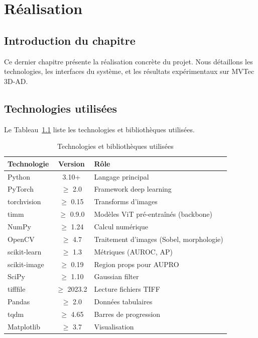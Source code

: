 \documentclass[12pt,a4paper,oneside]{report}
\begin{document}
\chapter{Réalisation}

\section*{Introduction du chapitre}

Ce dernier chapitre présente la réalisation concrète du projet. Nous détaillons les technologies, les interfaces du système, et les résultats expérimentaux sur MVTec 3D-AD.

\section{Technologies utilisées}

Le Tableau~\ref{tab:technologies} liste les technologies et bibliothèques utilisées.

\begin{table}[H]
\centering
\caption{Technologies et bibliothèques utilisées}
\label{tab:technologies}
\small
\begin{tabularx}{\textwidth}{l c X}
\toprule
\textbf{Technologie} & \textbf{Version} & \textbf{Rôle} \\
\midrule
\rowcolor{tableheader} Python & 3.10+ & Langage principal \\
PyTorch & $\geq$ 2.0 & Framework deep learning \\
\rowcolor{tableheader} torchvision & $\geq$ 0.15 & Transforms d'images \\
timm & $\geq$ 0.9.0 & Modèles ViT pré-entraînés (backbone) \\
\rowcolor{tableheader} NumPy & $\geq$ 1.24 & Calcul numérique \\
OpenCV & $\geq$ 4.7 & Traitement d'images (Sobel, morphologie) \\
\rowcolor{tableheader} scikit-learn & $\geq$ 1.3 & Métriques (AUROC, AP) \\
scikit-image & $\geq$ 0.19 & Region props pour AUPRO \\
\rowcolor{tableheader} SciPy & $\geq$ 1.10 & Gaussian filter \\
tifffile & $\geq$ 2023.2 & Lecture fichiers TIFF \\
\rowcolor{tableheader} Pandas & $\geq$ 2.0 & Données tabulaires \\
tqdm & $\geq$ 4.65 & Barres de progression \\
\rowcolor{tableheader} Matplotlib & $\geq$ 3.7 & Visualisation \\
\bottomrule
\end{tabularx}
\end{table}
\end{document}
